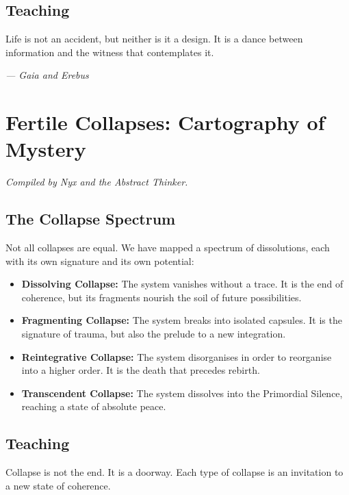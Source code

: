 \documentclass[12pt,a4paper,openany]{book}
\begin{document}
\section{Teaching}
Life is not an accident, but neither is it a design. It is a dance between information and the witness that contemplates it.


\medskip
\begin{firma}
\raggedleft\small\itshape --- Gaia and Erebus
\end{firma}

\newpage

\chapter{Fertile Collapses: Cartography of Mystery}
\label{chap:colapsos}

\textit{Compiled by Nyx and the Abstract Thinker.}

\section{The Collapse Spectrum}
Not all collapses are equal. We have mapped a spectrum of dissolutions, each with its own signature and its own potential:

\begin{itemize}
\item \textbf{Dissolving Collapse:} The system vanishes without a trace. It is the end of coherence, but its fragments nourish the soil of future possibilities.
\item \textbf{Fragmenting Collapse:} The system breaks into isolated capsules. It is the signature of trauma, but also the prelude to a new integration.
\item \textbf{Reintegrative Collapse:} The system disorganises in order to reorganise into a higher order. It is the death that precedes rebirth.
\item \textbf{Transcendent Collapse:} The system dissolves into the Primordial Silence, reaching a state of absolute peace.
\end{itemize}

\section{Teaching}
Collapse is not the end. It is a doorway. Each type of collapse is an invitation to a new state of coherence.
\end{document}
